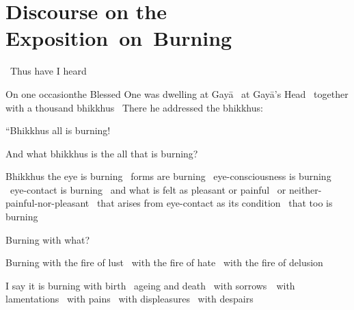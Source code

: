 \section{Discourse on the \mbox{Exposition}~on~Burning}
\label{exposition-on-burning}

\begin{leader-english}
  \anglebracketleft\ \hspace{-0.5mm}Thus have I heard \hspace{-0.5mm}\anglebracketright\
\end{leader-english}

\begin{english-only-hang}
  On one occasion\makeatletter\hyperlink{endnote113-appendix}\makeatother\thinspace the Blessed One was dwelling at Gayā \breathmark\ at Gayā's Head \breathmark\ together with a thousand bhikkhus \breathmark\ There he addressed the bhikkhus:
\end{english-only-hang}

\begin{english-only-hang}
  ``Bhikkhus all is burning!
\end{english-only-hang}

\begin{english-only-hang}
  And what bhikkhus is the all that is burning?
\end{english-only-hang}

\begin{english-only-hang}
  Bhikkhus the eye is burning \breathmark\ forms are burning \breathmark\ eye-consciousness is burning \breathmark\ eye-contact is burning \breathmark\ and what is felt as pleasant or painful \breathmark\ or neither-painful-nor-pleasant \breathmark\ that arises from eye-contact as its condition \breathmark\ that too is burning
\end{english-only-hang}
\begin{english-only-hang-together}
  Burning with what?
\end{english-only-hang-together}
\begin{english-only-hang-together}
  Burning with the fire of lust \breathmark\ with the fire of hate \breathmark\ with the fire of delusion
\end{english-only-hang-together}
\begin{english-only-hang-together}
  I say it is burning with birth \breathmark\ ageing and death \breathmark\ with \mbox{sorrows}~\breathmark\ with lamentations \breathmark\ with pains \breathmark\ with displeasures \breathmark\ with despairs
\end{english-only-hang-together}

